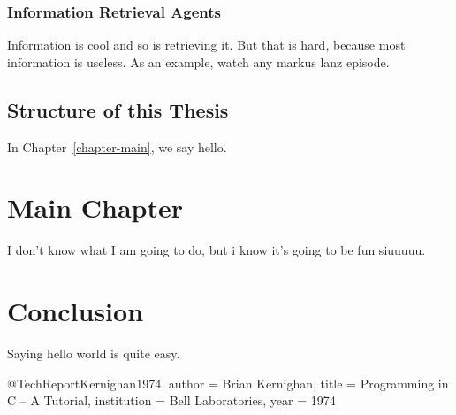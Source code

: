 \documentclass[english, version-2022-01]{uzl-thesis}
\begin{document}
\subsection{Information Retrieval Agents}
Information is cool and so is retrieving it. But that is hard, because most information is useless. As an example, watch any markus lanz episode.
\section{Structure of this Thesis}


In Chapter~\vref{chapter-main}, we say hello.
\chapter{Main Chapter}
\label{chapter-main}
I don't know what I am going to do, but i know it's going to be fun siuuuuu.
\chapter{Conclusion}
Saying hello world is quite easy.
\begin{bibtex-entries}
@TechReport{Kernighan1974,
	author = {Brian Kernighan},
	title = {Programming in C – A Tutorial},
	institution = {Bell Laboratories},
	year = {1974}
}
\end{bibtex-entries}
\end{document}
